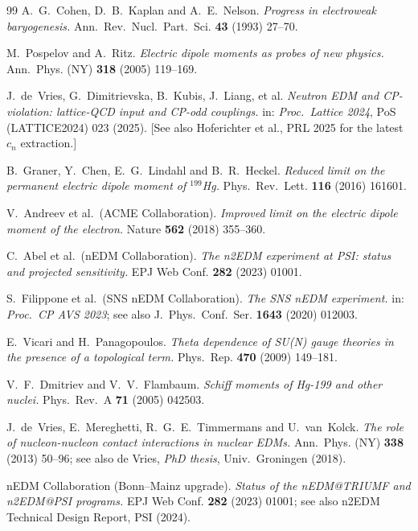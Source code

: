 \documentclass[11pt,a4paper]{article}
\theoremstyle{plain}
\theoremstyle{definition}
\theoremstyle{remark}
\begin{document}
\begin{thebibliography}{99}
A.~G.~Cohen, D.~B.~Kaplan and A.~E.~Nelson.
\textit{Progress in electroweak baryogenesis.}
Ann.~Rev.~Nucl.~Part.~Sci. \textbf{43} (1993) 27--70.

M.~Pospelov and A.~Ritz.
\textit{Electric dipole moments as probes of new physics.}
Ann.~Phys. (NY) \textbf{318} (2005) 119--169.

J.~de~Vries, G.~Dimitrievska, B.~Kubis, J.~Liang, et al.
\textit{Neutron EDM and CP-violation: lattice-QCD input and CP-odd couplings.}
in: \emph{Proc.~Lattice 2024}, PoS (LATTICE2024) 023 (2025).
[See also Hoferichter et al., PRL 2025 for the latest $c_n$ extraction.]

B.~Graner, Y.~Chen, E.~G.~Lindahl and B.~R.~Heckel.
\textit{Reduced limit on the permanent electric dipole moment of $^{199}$Hg.}
Phys.~Rev.~Lett. \textbf{116} (2016) 161601.

V.~Andreev et al.\ (ACME Collaboration).
\textit{Improved limit on the electric dipole moment of the electron.}
Nature \textbf{562} (2018) 355--360.

C.~Abel et al.\ (nEDM Collaboration).
\textit{The n2EDM experiment at PSI: status and projected sensitivity.}
EPJ Web Conf. \textbf{282} (2023) 01001.

S.~Filippone et al.\ (SNS nEDM Collaboration).
\textit{The SNS nEDM experiment.}
in: \emph{Proc.~CP AVS 2023}; see also J.~Phys.~Conf.~Ser. \textbf{1643} (2020) 012003.

E.~Vicari and H.~Panagopoulos.
\textit{Theta dependence of SU(N) gauge theories in the presence of a topological term.}
Phys.~Rep. \textbf{470} (2009) 149--181.

V.~F.~Dmitriev and V.~V.~Flambaum.
\textit{Schiff moments of Hg-199 and other nuclei.}
Phys.~Rev.~A \textbf{71} (2005) 042503.

J.~de~Vries, E.~Mereghetti, R.~G.~E.~Timmermans and U.~van~Kolck.
\textit{The role of nucleon-nucleon contact interactions in nuclear EDMs.}
Ann.~Phys. (NY) \textbf{338} (2013) 50--96;
see also de Vries, \emph{PhD thesis}, Univ.~Groningen (2018).

nEDM Collaboration (Bonn--Mainz upgrade).
\textit{Status of the nEDM@TRIUMF and n2EDM@PSI programs.}
EPJ Web Conf. \textbf{282} (2023) 01001;
see also n2EDM Technical Design Report, PSI (2024).


\end{thebibliography}
\end{document}
